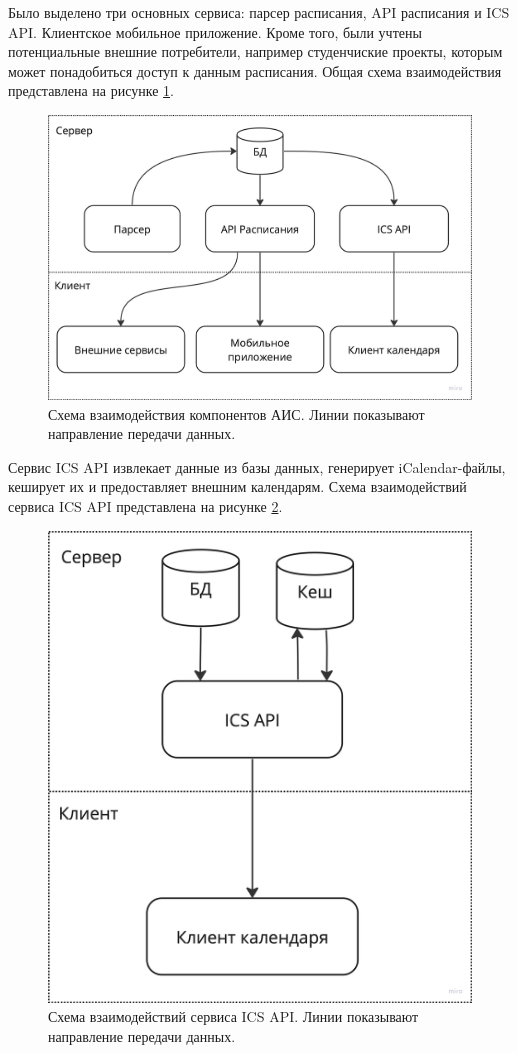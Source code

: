 Было выделено три основных сервиса: парсер расписания, API расписания и ICS API. 
Клиентское мобильное приложение. Кроме того, были учтены потенциальные внешние потребители,
например студенчиские проекты, которым может понадобиться доступ к данным расписания. 
Общая схема взаимодействия представлена на рисунке \ref{fig:schemes:overal}.

\begin{figure}
  \centering
  \includegraphics[width=0.8\linewidth]{images/schemes/overal.png}
  \caption{Схема взаимодействия компонентов АИС. Линии показывают направление передачи данных.}
  \label{fig:schemes:overal}
\end{figure}

Сервис ICS API извлекает данные из базы данных, генерирует 
iCalendar-файлы, кеширует их и предоставляет внешним календарям.
Схема взаимодействий сервиса ICS API представлена на рисунке \ref{fig:schemes:ics}.

\begin{figure}
  \centering
  \includegraphics[width=0.8\linewidth]{images/schemes/ics.png}
  \caption{Схема взаимодействий сервиса ICS API. Линии показывают направление передачи данных.}
  \label{fig:schemes:ics}
\end{figure}

